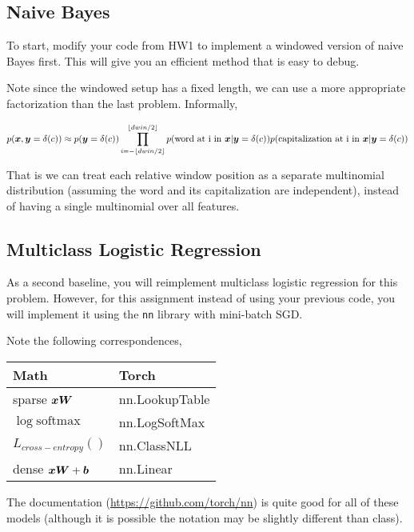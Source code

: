 \documentclass[11pt]{article}
\begin{document}
\subsection{Naive Bayes}

To start, modify your code from HW1
to implement a windowed version of
naive Bayes first. This will give
you an efficient method that is easy
to debug.

Note since the windowed setup has a fixed length, we can use a more appropriate 
factorization than the last problem. Informally,

\[ p(\boldsymbol{x}, \boldsymbol{y}=\delta(c)) \approx p(\boldsymbol{y}=\delta(c)) \prod_{i=-\lfloor{dwin/2}\rfloor}^{\lfloor{dwin/2}\rfloor}
p(\mathrm{word\ at\ i\ in\ }\boldsymbol{x} | \boldsymbol{y} =\delta(c))
p(\mathrm{capitalization\ at\ i\ in\ }\boldsymbol{x} | \boldsymbol{y} =\delta(c)) \]

That is we can treat each relative window position as a separate
multinomial distribution (assuming the word and its
capitalization are independent), instead of having a single multinomial
over all features.


\subsection{Multiclass Logistic Regression}

As a second baseline, you will reimplement multiclass logistic
regression for this problem. However, for this assignment instead of
using your previous code, you will implement it using the \texttt{nn}
library with mini-batch SGD.



Note the following correspondences,

\begin{center}
  \begin{tabular}{ll}
    \toprule
    Math & Torch \\
    \midrule 
    sparse $\boldsymbol{x} \boldsymbol{W}$ & nn.LookupTable \\ 
    $\log \mathrm{softmax}$ & nn.LogSoftMax \\ 
    $L_{cross-entropy}()$ & nn.ClassNLL \\ 
    dense $\boldsymbol{x} \boldsymbol{W} + \boldsymbol{b}$ & nn.Linear \\ 
    \bottomrule
  \end{tabular}
\end{center}
The documentation (\url{https://github.com/torch/nn}) is quite good
for all of these models (although it is possible the notation may be
slightly different than class).
\end{document}
